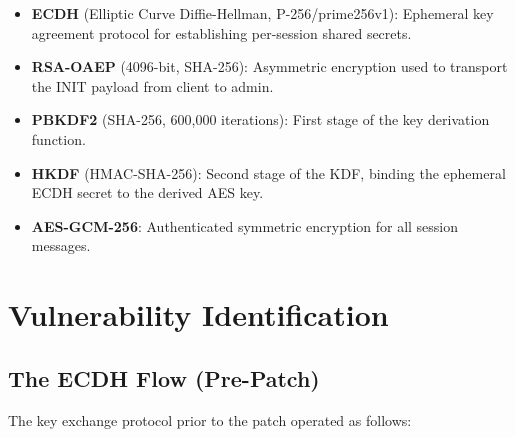 \documentclass[12pt,a4paper]{article}
\begin{document}
\begin{itemize}
    \item \textbf{ECDH} (Elliptic Curve Diffie-Hellman, P-256/prime256v1): Ephemeral key agreement protocol for establishing per-session shared secrets.
    \item \textbf{RSA-OAEP} (4096-bit, SHA-256): Asymmetric encryption used to transport the INIT payload from client to admin.
    \item \textbf{PBKDF2} (SHA-256, 600,000 iterations): First stage of the key derivation function.
    \item \textbf{HKDF} (HMAC-SHA-256): Second stage of the KDF, binding the ephemeral ECDH secret to the derived AES key.
    \item \textbf{AES-GCM-256}: Authenticated symmetric encryption for all session messages.
\end{itemize}

\section{Vulnerability Identification}

\subsection{The ECDH Flow (Pre-Patch)}

The key exchange protocol prior to the patch operated as follows:
\end{document}
